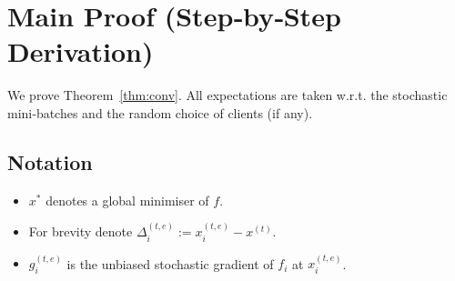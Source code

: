 \documentclass{article}
\begin{document}
\vspace{0.2cm}
\section*{Main Proof (Step‑by‑Step Derivation)}
We prove Theorem~\ref{thm:conv}.  All expectations are taken w.r.t. the stochastic mini‑batches and the random choice of clients (if any).  

\subsection*{Notation}
\begin{itemize}
    \item $x^{*}$ denotes a global minimiser of $f$.
    \item For brevity denote $\Delta_{i}^{(t,e)}:=x_{i}^{(t,e)}-x^{(t)}$.
    \item $g_{i}^{(t,e)}$ is the unbiased stochastic gradient of $f_i$ at $x_{i}^{(t,e)}$.
\end{itemize}
\end{document}
